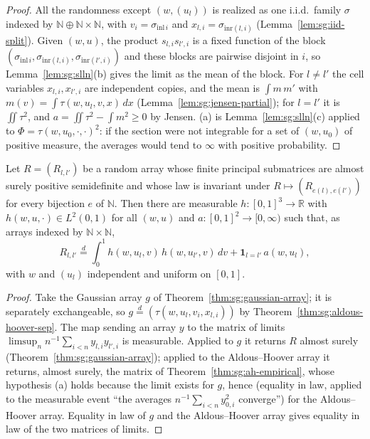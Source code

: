 \begin{proof}
  \leanok
{}
All the randomness except $(w,(u_l))$ is realized as one i.i.d.\ family $\sigma$ indexed by $\mathbb N\oplus\mathbb N\times\mathbb N$, with $v_i=\sigma_{\mathrm{inl}\,i}$ and $x_{l,i}=\sigma_{\mathrm{inr}(l,i)}$ (Lemma~\ref{lem:sg:iid-split}). Given $(w,u)$, the product $s_{l,i}s_{l',i}$ is a fixed function of the block $(\sigma_{\mathrm{inl}\,i},\sigma_{\mathrm{inr}(l,i)},\sigma_{\mathrm{inr}(l',i)})$ and these blocks are pairwise disjoint in $i$, so Lemma~\ref{lem:sg:slln}(b) gives the limit as the mean of the block. For $l\ne l'$ the cell variables $x_{l,i},x_{l',i}$ are independent copies, and the mean is $\int m\,m'$ with $m(v)=\int\tau(w,u_l,v,x)\,dx$ (Lemma~\ref{lem:sg:jensen-partial}); for $l=l'$ it is $\iint\tau^2$, and $a=\iint\tau^2-\int m^2\ge0$ by Jensen. (a) is Lemma~\ref{lem:sg:slln}(c) applied to $\Phi=\tau(w,u_0,\cdot,\cdot)^2$: if the section were not integrable for a set of $(w,u_0)$ of positive measure, the averages would tend to $\infty$ with positive probability.
\end{proof}

\begin{theorem}\label{thm:sg:dovbysh-sudakov}
  \leanok
Let $R=(R_{l,l'})$ be a random array whose finite principal submatrices are almost surely positive semidefinite and whose law is invariant under $R\mapsto(R_{e(l),e(l')})$ for every bijection $e$ of $\mathbb N$. Then there are measurable $h:[0,1]^3\to\mathbb R$ with $h(w,u,\cdot)\in L^2(0,1)$ for all $(w,u)$ and $a:[0,1]^2\to[0,\infty)$ such that, as arrays indexed by $\mathbb N\times\mathbb N$,
\[R_{l,l'}\overset d=\int_0^1h(w,u_l,v)\,h(w,u_{l'},v)\,dv+\mathbf 1_{l=l'}\,a(w,u_l),\]
with $w$ and $(u_l)$ independent and uniform on $[0,1]$.
\end{theorem}

\begin{proof}
  \leanok
{}
Take the Gaussian array $g$ of Theorem~\ref{thm:sg:gaussian-array}; it is separately exchangeable, so $g\overset d=(\tau(w,u_l,v_i,x_{l,i}))$ by Theorem~\ref{thm:sg:aldous-hoover-sep}. The map sending an array $y$ to the matrix of limits $\limsup_n n^{-1}\sum_{i<n}y_{l,i}y_{l',i}$ is measurable. Applied to $g$ it returns $R$ almost surely (Theorem~\ref{thm:sg:gaussian-array}); applied to the Aldous--Hoover array it returns, almost surely, the matrix of Theorem~\ref{thm:sg:ah-empirical}, whose hypothesis (a) holds because the limit exists for $g$, hence (equality in law, applied to the measurable event ``the averages $n^{-1}\sum_{i<n}y_{0,i}^2$ converge'') for the Aldous--Hoover array. Equality in law of $g$ and the Aldous--Hoover array gives equality in law of the two matrices of limits.
\end{proof}

